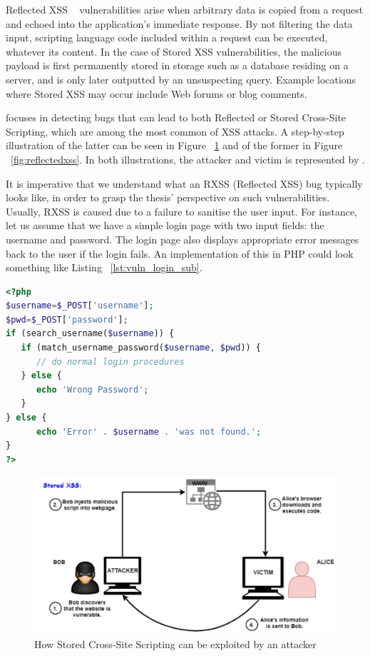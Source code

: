 Reflected XSS ~\cite{rxss_def} vulnerabilities arise when arbitrary data is copied from a request and echoed into the application's immediate response. By not filtering the data input, scripting language code included within a request can be executed, whatever its content. In the case of Stored XSS vulnerabilities, the malicious payload is first permanently stored in storage such as a database residing on a server, and is only later outputted by an unsuspecting query. Example locations where Stored XSS may occur include Web forums or blog comments. 

\pname{} focuses in detecting bugs that can lead to both Reflected or Stored Cross-Site Scripting, which are among the most common of XSS attacks. A step-by-step illustration of the latter can be seen in Figure ~\ref{fig:storedxss} and of the former in Figure ~\ref{fig:reflectedxss}. In both illustrations, the attacker and victim is represented by \pname{}.

It is imperative that we understand what an RXSS (Reflected XSS) bug typically looks like, in order to grasp the thesis' perspective on such vulnerabilities. Usually, RXSS is caused due to a failure to sanitise the user input. For instance, let us assume that we have a simple login page with two input fields: the username and password. The login page also displays appropriate error messages back to the user if the login fails. An implementation of this in PHP could look something like Listing ~\ref{lst:vuln_login_sub}.

\begin{lstlisting}[showstringspaces=false, frame=single, language=PHP, caption={Vulnerable login form}, numberstyle=\color{gray}, numbersep=5pt, label={lst:vuln_login_sub}]
<?php
$username=$_POST['username'];
$pwd=$_POST['password'];
if (search_username($username)) {
   if (match_username_password($username, $pwd)) {
      // do normal login procedures
   } else {
      echo 'Wrong Password';
   }
} else {
      echo 'Error' . $username . 'was not found.';
}
?>
\end{lstlisting}

\begin{figure}[ht]
 \centering
 \captionsetup{justification=centering}
 \includegraphics[width=\linewidth]{figures/storedxss.pdf}
 \caption{How Stored Cross-Site Scripting can be exploited by an attacker}
 \label{fig:storedxss}
\end{figure}

